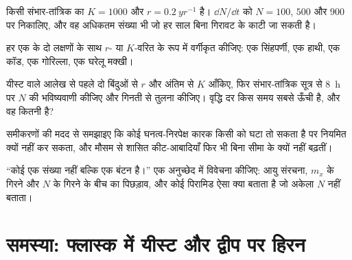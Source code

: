 \begin{exercise}[$\star\star$]\label{exo:b1:populations:8}
किसी संभार-तांत्रिक  का $K = 1000$ और $r = \qty{0.2}{yr^{-1}}$ है।
$\dd N/\dd t$ को $N = 100$, $500$ और $900$ पर निकालिए, और वह अधिकतम
संख्या भी जो हर साल बिना गिरावट के काटी जा सकती है।
\end{exercise}

\begin{exercise}[$\star\star$]\label{exo:b1:populations:9}
हर एक के दो लक्षणों के साथ $r$- या $K$-वरित के रूप में वर्गीकृत कीजिए:
एक सिंहपर्णी, एक हाथी, एक कॉड, एक गोरिल्ला, एक घरेलू मक्खी।
\end{exercise}

\begin{exercise}[$\star\star\star$]\label{exo:b1:populations:10}
यीस्ट वाले आलेख से पहले दो बिंदुओं से $r$ और अंतिम से $K$ आँकिए, फिर
संभार-तांत्रिक सूत्र से \qty{8}{h} पर $N$ की भविष्यवाणी कीजिए और गिनती
से तुलना कीजिए। वृद्धि दर किस समय सबसे ऊँची है, और वह कितनी है?
\end{exercise}

\begin{exercise}[$\star\star\star$]\label{exo:b1:populations:11}
समीकरणों की मदद से समझाइए कि कोई घनत्व-निरपेक्ष कारक किसी  को घटा
तो सकता है पर नियमित क्यों नहीं कर सकता, और मौसम से शासित कीट-आबादियाँ
फिर भी बिना सीमा के क्यों नहीं बढ़तीं।
\end{exercise}

\begin{exercise}[$\star\star\star$]\label{exo:b1:populations:12}
``कोई  एक संख्या नहीं बल्कि एक बंटन है।'' एक अनुच्छेद में विवेचना
कीजिए: आयु संरचना, $m_x$ के गिरने और $N$ के गिरने के बीच का पिछड़ाव, और
कोई पिरामिड ऐसा क्या बताता है जो अकेला $N$ नहीं बताता।
\end{exercise}

\section{समस्या: फ्लास्क में यीस्ट और द्वीप पर हिरन}

